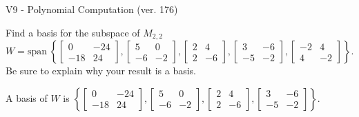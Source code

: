 \begin{exercise}
  \begin{exerciseTitle}V9 - Polynomial Computation (ver. 176)\end{exerciseTitle}
  \begin{exerciseStatement}
    Find a basis for the subspace of \(M_{2,2}\) 
\[W=\mathrm{span}\ \left\{\left[\begin{array}{cc}
0 & -24 \\
-18 & 24
\end{array}\right] , \left[\begin{array}{cc}
5 & 0 \\
-6 & -2
\end{array}\right] , \left[\begin{array}{cc}
2 & 4 \\
2 & -6
\end{array}\right] , \left[\begin{array}{cc}
3 & -6 \\
-5 & -2
\end{array}\right] , \left[\begin{array}{cc}
-2 & 4 \\
4 & -2
\end{array}\right]\right\}.\]
 Be sure to explain why your result is a basis.


  \end{exerciseStatement}
  \begin{exerciseAnswer}
   A basis of \(W\) is  \(\left\{\left[\begin{array}{cc}
0 & -24 \\
-18 & 24
\end{array}\right] , \left[\begin{array}{cc}
5 & 0 \\
-6 & -2
\end{array}\right] , \left[\begin{array}{cc}
2 & 4 \\
2 & -6
\end{array}\right] , \left[\begin{array}{cc}
3 & -6 \\
-5 & -2
\end{array}\right]\right\}\).
  


  \end{exerciseAnswer}
\end{exercise}